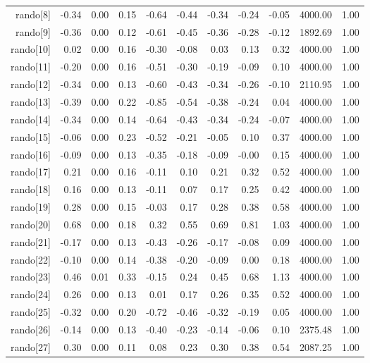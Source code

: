 \begin{table}[ht]
\begin{tabular}{rrrrrrrrrrr}
  rando[8] & -0.34 & 0.00 & 0.15 & -0.64 & -0.44 & -0.34 & -0.24 & -0.05 & 4000.00 & 1.00 \\ 
  rando[9] & -0.36 & 0.00 & 0.12 & -0.61 & -0.45 & -0.36 & -0.28 & -0.12 & 1892.69 & 1.00 \\ 
  rando[10] & 0.02 & 0.00 & 0.16 & -0.30 & -0.08 & 0.03 & 0.13 & 0.32 & 4000.00 & 1.00 \\ 
  rando[11] & -0.20 & 0.00 & 0.16 & -0.51 & -0.30 & -0.19 & -0.09 & 0.10 & 4000.00 & 1.00 \\ 
  rando[12] & -0.34 & 0.00 & 0.13 & -0.60 & -0.43 & -0.34 & -0.26 & -0.10 & 2110.95 & 1.00 \\ 
  rando[13] & -0.39 & 0.00 & 0.22 & -0.85 & -0.54 & -0.38 & -0.24 & 0.04 & 4000.00 & 1.00 \\ 
  rando[14] & -0.34 & 0.00 & 0.14 & -0.64 & -0.43 & -0.34 & -0.24 & -0.07 & 4000.00 & 1.00 \\ 
  rando[15] & -0.06 & 0.00 & 0.23 & -0.52 & -0.21 & -0.05 & 0.10 & 0.37 & 4000.00 & 1.00 \\ 
  rando[16] & -0.09 & 0.00 & 0.13 & -0.35 & -0.18 & -0.09 & -0.00 & 0.15 & 4000.00 & 1.00 \\ 
  rando[17] & 0.21 & 0.00 & 0.16 & -0.11 & 0.10 & 0.21 & 0.32 & 0.52 & 4000.00 & 1.00 \\ 
  rando[18] & 0.16 & 0.00 & 0.13 & -0.11 & 0.07 & 0.17 & 0.25 & 0.42 & 4000.00 & 1.00 \\ 
  rando[19] & 0.28 & 0.00 & 0.15 & -0.03 & 0.17 & 0.28 & 0.38 & 0.58 & 4000.00 & 1.00 \\ 
  rando[20] & 0.68 & 0.00 & 0.18 & 0.32 & 0.55 & 0.69 & 0.81 & 1.03 & 4000.00 & 1.00 \\ 
  rando[21] & -0.17 & 0.00 & 0.13 & -0.43 & -0.26 & -0.17 & -0.08 & 0.09 & 4000.00 & 1.00 \\ 
  rando[22] & -0.10 & 0.00 & 0.14 & -0.38 & -0.20 & -0.09 & 0.00 & 0.18 & 4000.00 & 1.00 \\ 
  rando[23] & 0.46 & 0.01 & 0.33 & -0.15 & 0.24 & 0.45 & 0.68 & 1.13 & 4000.00 & 1.00 \\ 
  rando[24] & 0.26 & 0.00 & 0.13 & 0.01 & 0.17 & 0.26 & 0.35 & 0.52 & 4000.00 & 1.00 \\ 
  rando[25] & -0.32 & 0.00 & 0.20 & -0.72 & -0.46 & -0.32 & -0.19 & 0.05 & 4000.00 & 1.00 \\ 
  rando[26] & -0.14 & 0.00 & 0.13 & -0.40 & -0.23 & -0.14 & -0.06 & 0.10 & 2375.48 & 1.00 \\ 
  rando[27] & 0.30 & 0.00 & 0.11 & 0.08 & 0.23 & 0.30 & 0.38 & 0.54 & 2087.25 & 1.00 \\ 

\end{tabular}
\end{table}
